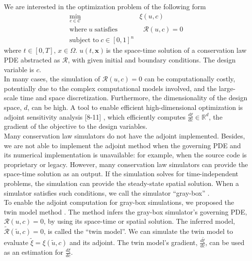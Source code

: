 \documentclass[a4paper,onecolumn]{article}
\theoremstyle{remark}
\begin{document}
\indent We are interested in the optimization problem of the following form
\begin{equation}\begin{split}
    \min_{c\in\mathcal{C}} & \xi(u,c)\\
    \textrm{where}\; u\; \textrm{satisfies}& \;\; \mathcal{R}(u,c) = 0\\
    \textrm{subject to} \; c\in [0,1]^n
\end{split}\label{general opt}
\end{equation}
where $t\in[0,T], \,x\in\Omega$.
$u(t,\mathbf{x})$\,is the space-time solution of a conservation law PDE abstracted as
$\mathcal{R}$, with given initial and boundary conditions. The design variable is $c$.\\

\indent 
In many cases, the simulation of $\mathcal{R}(u,c)=0$ can be computationally costly, potentially 
due to the complex computational models involved, and the
large-scale time and space discretization. Furthermore, 
the dimensionality of the design space, $d$, can be high. 
A tool to enable efficient high-dimensional optimization is adjoint sensitivity analysis
[8-11]
, which efficiently computes $\frac{d\xi}{dc} \in\mathbb{R}^d$, the gradient of the objective to the design variables. 
\\

\indent Many conservation law simulators do not have the adjoint implemented.
Besides, we are not able to implement the adjoint method
when the governing PDE and its numerical implementation is unavailable:
for example, when the source code is proprietary or legacy.
However, many conservation law simulators can provide the space-time solution as an output.
If the simulation solves for time-independent problems, the simulation can
provide the steady-state spatial solution. When a simulator satisfies such conditions, we call the 
simulator ``gray-box'' \cite{twin model}.\\

\indent To enable the adjoint computation for gray-box simulations, we proposed the twin model method  
\cite{twin model}.
The method infers the gray-box simulator's governing PDE, $\mathcal{R}(u,c)=0$,
 by using its space-time or spatial solution.
The inferred model, $\tilde{\mathcal{R}}(\tilde{u},c)=0$, is called the ``twin model''. 
We can simulate the twin model to evaluate $\tilde{\xi} = \xi(\tilde{u},c)$ and its adjoint.
The twin model's gradient, $\frac{d \tilde{\xi}}{d c}$, can be used as an estimation for 
$\frac{d\xi}{dc}$.\\
\end{document}

